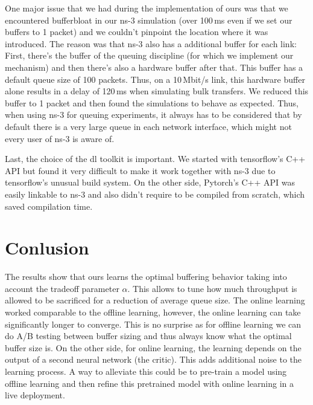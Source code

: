 \documentclass[conference]{IEEEtran}
\begin{document}
One major issue that we had during the implementation of \gls{ours} was that we encountered bufferbloat in our ns-3 simulation (over 100\,ms even if we set our buffers to 1 packet) and we couldn't pinpoint the location where it was introduced. The reason was that ns-3 also has a additional buffer for each link: First, there's the buffer of the queuing discipline (for which we implement our mechanism) and then there's also a hardware buffer after that. This buffer has a default queue size of 100 packets. Thus, on a 10\,Mbit/s link, this hardware buffer alone results in a delay of 120\,ms when simulating bulk transfers. We reduced this buffer to 1 packet and then found the simulations to behave as expected. Thus, when using ns-3 for queuing experiments, it always has to be considered that by default there is a very large queue in each network interface, which might not every user of ns-3 is aware of. 

Last, the choice of the \gls{dl} toolkit is important. We started with tensorflow's C++ API but found it very difficult to make it work together with ns-3 due to tensorflow's unusual build system. On the other side, Pytorch's C++ API was easily linkable to ns-3 and also didn't require to be compiled from scratch, which saved compilation time. 

\section{Conlusion}

The results show that \gls{ours} learns the optimal buffering behavior taking into account the tradeoff parameter $\alpha$. This allows to tune how much throughput is allowed to be sacrificed for a reduction of average queue size. The online learning worked comparable to the offline learning, however, the online learning can take significantly longer to converge. This is no surprise as for offline learning we can do A/B testing between buffer sizing and thus always know what the optimal buffer size is. On the other side, for online learning, the learning depends on the output of a second neural network (the critic). This adds additional noise to the learning process. A way to alleviate this could be to pre-train a model using offline learning and then refine this pretrained model with online learning in a live deployment. 
\end{document}
